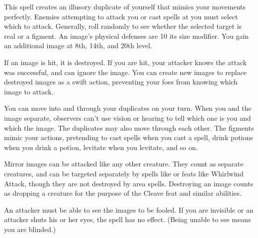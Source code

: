 \begin{spelleffect}
  This spell creates an illusory duplicate of yourself that mimics your movements perfectly. Enemies attempting to attack you or cast spells at you must select which to attack. Generally, roll randomly to see whether the selected target is real or a figment. An image's physical defenses are 10 \add its size modifier. You gain an additional image at 8th, 14th, and 20th level. 
  \par If an image is hit, it is destroyed. If you are hit, your attacker knows the attack was successful, and can ignore the image. You can create new images to replace destroyed images as a swift action, preventing your foes from knowing which image to attack.
  \par You can move into and through your duplicates on your turn. When you and the image separate, observers can't use vision or hearing to tell which one is you and which the image. The duplicates may also move through each other. The figments mimic your actions, pretending to cast spells when you cast a spell, drink potions when you drink a potion, levitate when you levitate, and so on.
  \par Mirror images can be attacked like any other creature. They count as separate creatures, and can be targeted separately by spells like  or feats like Whirlwind Attack, though they are not destroyed by area spells. Destroying an image counts as dropping a creature for the purpose of the Cleave feat and similar abilities.
\end{spelleffect}
\begin{spellnotes}
  An attacker must be able to see the images to be fooled. If you are invisible or an attacker shuts his or her eyes, the spell has no effect. (Being unable to see means you are blinded.)
\end{spellnotes}

